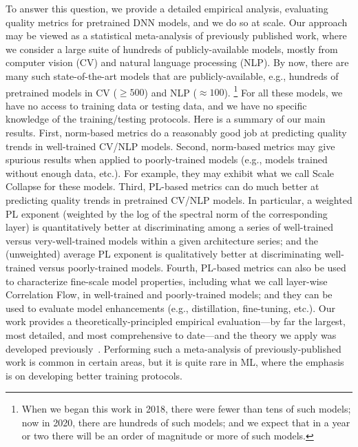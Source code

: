 To answer this question, we provide a detailed empirical analysis, evaluating quality metrics for pretrained DNN models, and we do so at scale.
Our approach may be viewed as a statistical meta-analysis of previously published work, where we consider a large suite of hundreds of publicly-available models, mostly from computer vision (CV) and natural language processing (NLP).
By now, there are many such state-of-the-art models that are publicly-available, e.g., 
hundreds of pretrained models in CV ($\ge 500$) and NLP ($\approx 100$).%
\footnote{When we began this work in 2018, there were fewer than tens of such models; now in 2020, there are hundreds of such models; and we expect that in a year or two there will be an order of magnitude or more of such models.}
For all these models, we have no access to training data or testing data, and we have no specific knowledge of the training/testing protocols. 
%
Here is a summary of our main results.
First, norm-based metrics do a reasonably good job at predicting quality trends in well-trained CV/NLP models.
Second, norm-based metrics may give spurious results when applied to poorly-trained models (e.g., models trained without enough data, etc.).
For example, they may exhibit what we call Scale Collapse for these models. 
Third, PL-based metrics can do much better at predicting quality trends in pretrained CV/NLP models.  
In particular, 
a weighted PL exponent (weighted by the log of the spectral norm of the corresponding layer) is 
quantitatively better at discriminating among a series of well-trained versus very-well-trained models
within a given architecture series; and
the (unweighted) average PL exponent is 
qualitatively better at discriminating well-trained versus poorly-trained models.
Fourth, PL-based metrics can also be used to characterize fine-scale model properties, including what we call layer-wise Correlation Flow, in well-trained and poorly-trained models; and they can be used to evaluate model enhancements (e.g., distillation, fine-tuning, etc.).
%
Our work provides a theoretically-principled empirical evaluation---by far the largest, most detailed, and most comprehensive to date---and the theory we apply was developed previously~\cite{MM18_TR, MM19_HTSR_ICML, MM20_SDM}.
Performing such a meta-analysis of previously-published work is common in certain areas, but it is quite rare in ML, where the emphasis is on developing better training protocols.


